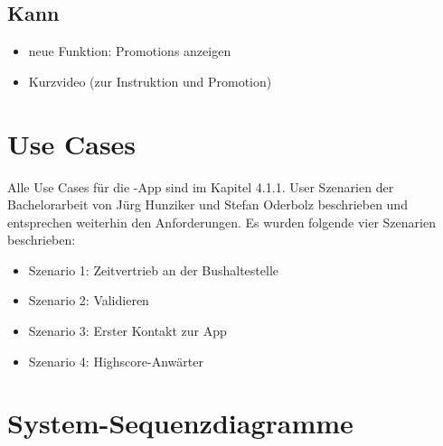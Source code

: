 \subsection{Kann}
\begin{itemize}
	\item neue Funktion: Promotions anzeigen
	\item Kurzvideo (zur Instruktion und Promotion)
\end{itemize}


\section{Use Cases}
Alle Use Cases für die \kort{}-App sind im Kapitel 4.1.1. User Szenarien der Bachelorarbeit von Jürg Hunziker und Stefan Oderbolz beschrieben und entsprechen weiterhin den Anforderungen. 
Es wurden folgende vier Szenarien beschrieben\cite{ba-kort-2012}: 

\begin{itemize}
	\item Szenario 1: Zeitvertrieb an der Bushaltestelle
	\item Szenario 2: Validieren
	\item Szenario 3: Erster Kontakt zur App
	\item Szenario 4: Highscore-Anwärter
\end{itemize}


\section{System-Sequenzdiagramme}
\cite{ba-kort-2012}
